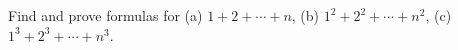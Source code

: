 Find and prove formulas for (a) $1+2+\cdots+n$, (b) $1^2+2^2+\cdots+n^2$, (c) $1^3+2^3+\cdots+n^3$.

